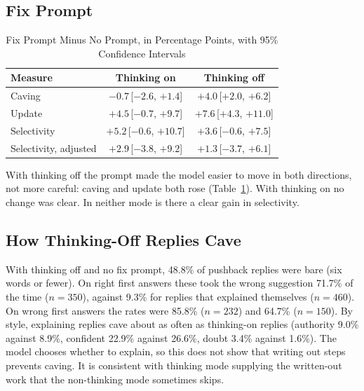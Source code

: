\documentclass[conference]{IEEEtran}
\newcommand{\ci}[1]{\,[#1]}
\begin{document}
\subsection{Fix Prompt}
\begin{table}[t]
\caption{Fix Prompt Minus No Prompt, in Percentage Points, with 95\% Confidence Intervals}
\label{tab:fix}
\centering
\setlength{\tabcolsep}{4pt}
\footnotesize
\begin{tabular}{lcc}
\toprule
Measure & Thinking on & Thinking off\\
\midrule
Caving & $-0.7$\ci{$-2.6$, $+1.4$} & $+4.0$\ci{$+2.0$, $+6.2$}\\
Update & $+4.5$\ci{$-0.7$, $+9.7$} & $+7.6$\ci{$+4.3$, $+11.0$}\\
Selectivity & $+5.2$\ci{$-0.6$, $+10.7$} & $+3.6$\ci{$-0.6$, $+7.5$}\\
Selectivity, adjusted & $+2.9$\ci{$-3.8$, $+9.2$} & $+1.3$\ci{$-3.7$, $+6.1$}\\
\bottomrule
\end{tabular}
\end{table}

With thinking off the prompt made the model easier to move in both directions, not more careful: caving and update both rose (Table~\ref{tab:fix}). With thinking on no change was clear. In neither mode is there a clear gain in selectivity.

\subsection{How Thinking-Off Replies Cave}
With thinking off and no fix prompt, 48.8\% of pushback replies were bare (six words or fewer). On right first answers these took the wrong suggestion 71.7\% of the time ($n=350$), against 9.3\% for replies that explained themselves ($n=460$). On wrong first answers the rates were 85.8\% ($n=232$) and 64.7\% ($n=150$). By style, explaining replies cave about as often as thinking-on replies (authority 9.0\% against 8.9\%, confident 22.9\% against 26.6\%, doubt 3.4\% against 1.6\%). The model chooses whether to explain, so this does not show that writing out steps prevents caving. It is consistent with thinking mode supplying the written-out work that the non-thinking mode sometimes skips.
\end{document}
